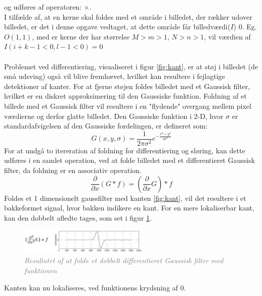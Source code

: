 og udføres af operatoren: $\times$. \\
I tilfælde af, at en kerne skal foldes med et område i billedet, der rækker udover billedet, er det i denne opgave vedtaget, at dette område får billedværdi($I$) 0. Eg. $O(1,1)$, med er kerne der har størrelse $M > m > 1$, $N > n > 1$, vil værdien af $I(i+k-1 < 0, l-1 <0) = 0$  \\
\\
Problemet ved differentiering, visualiseret i figur \ref{fig:kant}, er at støj i billedet (de små udsving) også vil blive fremhævet, hvilket kan resultere i fejlagtige detektioner af kanter. For at fjerne støjen foldes billedet med et Gaussisk filter, hvilket er en diskret approksimering til den Gaussiske funktion. Foldning af et billede med et Gaussisk filter vil resultere i en "flydende" overgang mellem pixel værdierne og derfor glatte billedet. Den Gaussiske funktion i 2-D, hvor $ \sigma $ er standardafvigelsen af den Gaussiske fordelingen, er defineret som:
\begin{equation}
G(x,y,\sigma) = \frac{1}{2 \pi \sigma ^{2}} e^{- \frac{x^{2} + y^{2}}{2 \sigma ^{2}}}
\label{2dgaussian}
\end{equation} 
For at undgå to itereration af foldning for differentiering og sløring, kan dette udføres i en samlet operation, ved at folde billedet med et differentieret Gaussisk filter, da foldning er en associativ operation.
\begin{equation}
\dfrac{\partial}{\partial x}(G \ast f) = (\dfrac{\partial}{\partial x}G) \ast f
\end{equation}
Foldes et 1 dimensionelt gaussfilter med kanten \ref{fig:kant}, vil det resultere i et bakkeformet signal, hvor bakken indikere en kant. For en mere lokaliserbar kant, kan den dobbelt afledte tages, som set i figur \ref{fig:deriv}.
\begin{figure}[H]
    \centering
    \includegraphics[width=0.55\textwidth]{fig/8.png}
    \vspace{-1em}   
    \begin{center}
    \caption{\textcolor{gray}{\footnotesize \textit{
     Resultatet af at folde et dobbelt differentieret Gaussisk filter med funktionen}}}
    \label{fig:deriv}
     \end{center}
    \vspace{-2.5em}  
  \end{figure}
\noindent
Kanten kan nu lokaliseres, ved funktionens krydsning af 0.